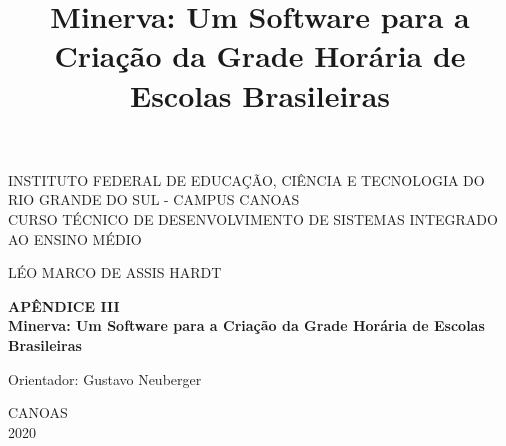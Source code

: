 \documentclass[12pt,a4paper]{article}
\title{Minerva:  Um Software para a Criação da Grade Horária de Escolas Brasileiras}
\newenvironment{bottompar}{\par\vspace*{\fill}}{\clearpage}
\begin{document}
		\thispagestyle{empty}

		\begin{center}
			INSTITUTO FEDERAL DE EDUCAÇÃO, CIÊNCIA E TECNOLOGIA DO RIO GRANDE DO SUL - CAMPUS CANOAS \\
			CURSO TÉCNICO DE DESENVOLVIMENTO DE SISTEMAS INTEGRADO AO ENSINO MÉDIO\\
		\end{center}

		\vskip 3cm

		\begin{center}
			LÉO MARCO DE ASSIS HARDT
		\end{center}

		\vskip 3cm

		\begin{center}
			\textbf{APÊNDICE III\\Minerva:  Um Software para a Criação da Grade Horária de Escolas Brasileiras}
		\end{center}

		\vskip 3cm

		\begin{center}
			Orientador: Gustavo Neuberger
		\end{center}

		\begin{bottompar}
			\begin{center}
			CANOAS \\
			2020
			\end{center}
		\end{bottompar}

\end{document}
